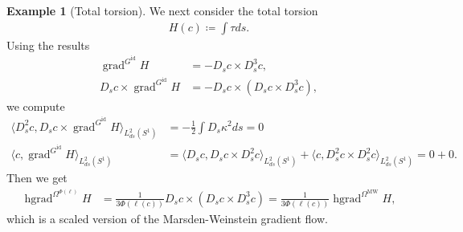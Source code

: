 \documentclass[12pt]{amsart}
\newcommand{\rev}[1]{#1}
\theoremstyle{definition}
\newtheorem{example}[theorem]{Example}
\newcommand{\id}{\mathrm{id}}
\newcommand{\OmMW}{\Omega^{\operatorname{MW}}}
\def\ka{\kappa}
\def\Om{\Omega}
\def\x{\times}
\let\on=\operatorname
\begin{document}
\begin{example}[Total torsion]\label{ex:torsion}
    We next consider the total torsion
    \begin{align}
        H(c)\coloneqq \int \tau ds.
    \end{align}
    Using the results \cite[Theorem 2]{chern_knöppel_pedit_pinkall_2020}
    \begin{align}
    \on{grad}^{G^\id}H&= -D_s c\x D_s^3 c,\\
    D_s c\x \on{grad}^{G^\id}H&=-D_s c\x (D_s c\x D_s^3 c),
    \end{align}
    we compute
    \begin{align}
    \langle D_s^2 c, D_s c\x \on{grad}^{G^\id} H\rangle_{L^2_{ds}(S^1)}&= -\frac{1}{2}\int D_s\ka^2 ds=  0\\
      \langle c, \on{grad}^{G^\id} H\rangle_{L^2_{ds}(S^1)}
     &= \langle D_s c, D_s c \x D_s^2 c\rangle_{L^2_{ds}(S^1)}+\langle c, D_s^2 c \x D_s^2 c\rangle_{L^2_{ds}(S^1)}= 0+0.
\end{align}
Then we get
\begin{align}
    \on{hgrad}^{\Om^{\Phi(\ell)}} H
    &=\frac{1}{3\Phi(\rev{\ell(c)})} D_s c\x (D_s c\x D_s^3 c)
     =\frac{1}{3\Phi(\rev{\ell(c)})}\on{hgrad}^{\OmMW}H 
     ,
\end{align}
which is a scaled version of the Marsden-Weinstein gradient flow.
\end{example}
\end{document}
